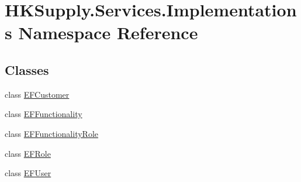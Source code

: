 \hypertarget{namespace_h_k_supply_1_1_services_1_1_implementations}{}\section{H\+K\+Supply.\+Services.\+Implementations Namespace Reference}
\label{namespace_h_k_supply_1_1_services_1_1_implementations}
\subsection*{Classes}
\begin{DoxyCompactItemize}
\item 
class \hyperlink{class_h_k_supply_1_1_services_1_1_implementations_1_1_e_f_customer}{E\+F\+Customer}
\item 
class \hyperlink{class_h_k_supply_1_1_services_1_1_implementations_1_1_e_f_functionality}{E\+F\+Functionality}
\item 
class \hyperlink{class_h_k_supply_1_1_services_1_1_implementations_1_1_e_f_functionality_role}{E\+F\+Functionality\+Role}
\item 
class \hyperlink{class_h_k_supply_1_1_services_1_1_implementations_1_1_e_f_role}{E\+F\+Role}
\item 
class \hyperlink{class_h_k_supply_1_1_services_1_1_implementations_1_1_e_f_user}{E\+F\+User}
\end{DoxyCompactItemize}
